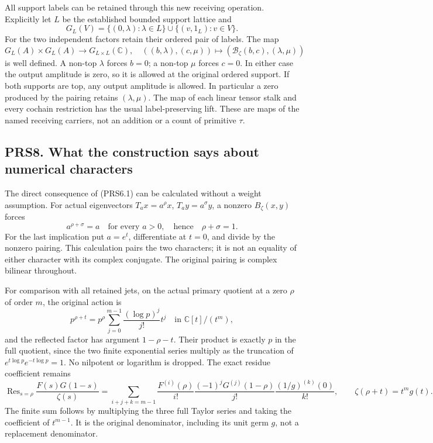 All support labels can be retained through this new receiving operation.
Explicitly let \(L\) be the established bounded support lattice and \[
G_L(V)=\{(0,\lambda):\lambda\in L\}\cup\{(v,1_L):v\in V\}.
\] For the two independent factors retain their ordered pair of labels.
The map \[
G_L(A)\times G_L(A)\longrightarrow G_{L\times L}(\mathbb C),\quad
((b,\lambda),(c,\mu))\longmapsto(\mathcal B_\zeta(b,c),(\lambda,\mu))
\tag{PRS7.2}
\] is well defined. A non-top \(\lambda\) forces \(b=0\); a non-top
\(\mu\) forces \(c=0\). In either case the output amplitude is zero, so
it is allowed at the original ordered support. If both supports are top,
any output amplitude is allowed. In particular a zero produced by the
pairing retains \((\lambda,\mu)\). The map of each linear tensor stalk
and every cochain restriction has the usual label-preserving lift. These
are maps of the named receiving carriers, not an addition or a count of
primitive \(\tau\).

\subsection{PRS8. What the construction says about numerical
characters}\label{prs8.-what-the-construction-says-about-numerical-characters}

The direct consequence of (PRS6.1) can be calculated without a weight
assumption. For actual eigenvectors \(T_ax=a^\rho x\),
\(T_ay=a^\sigma y\), a nonzero \(B_\zeta(x,y)\) forces \[
a^{\rho+\sigma}=a\quad\text{for every }a>0,
\quad\text{hence}\quad\rho+\sigma=1.
\tag{PRS8.1}
\] For the last implication put \(a=e^t\), differentiate at \(t=0\), and
divide by the nonzero pairing. This calculation pairs the two
characters; it is not an equality of either character with its complex
conjugate. The original pairing is complex bilinear throughout.

For comparison with all retained jets, on the actual primary quotient at
a zero \(\rho\) of order \(m\), the original action is \[
p^{\rho+t}=p^\rho\sum_{j=0}^{m-1}\frac{(\log p)^j}{j!}t^j
\quad\text{in }\mathbb C[t]/(t^m),
\tag{PRS8.2}
\] and the reflected factor has argument \(1-\rho-t\). Their product is
exactly \(p\) in the full quotient, since the two finite exponential
series multiply as the truncation of \(e^{t\log p}e^{-t\log p}=1\). No
nilpotent or logarithm is dropped. The exact residue coefficient remains
\[
\operatorname{Res}_{s=\rho}\frac{F(s)G(1-s)}{\zeta(s)}
=\sum_{i+j+k=m-1}\frac{F^{(i)}(\rho)}{i!}
\frac{(-1)^jG^{(j)}(1-\rho)}{j!}
\frac{(1/g)^{(k)}(0)}{k!},\qquad
\zeta(\rho+t)=t^m g(t).
\tag{PRS8.3}
\] The finite sum follows by multiplying the three full Taylor series
and taking the coefficient of \(t^{m-1}\). It is the original
denominator, including its unit germ \(g\), not a replacement
denominator.

